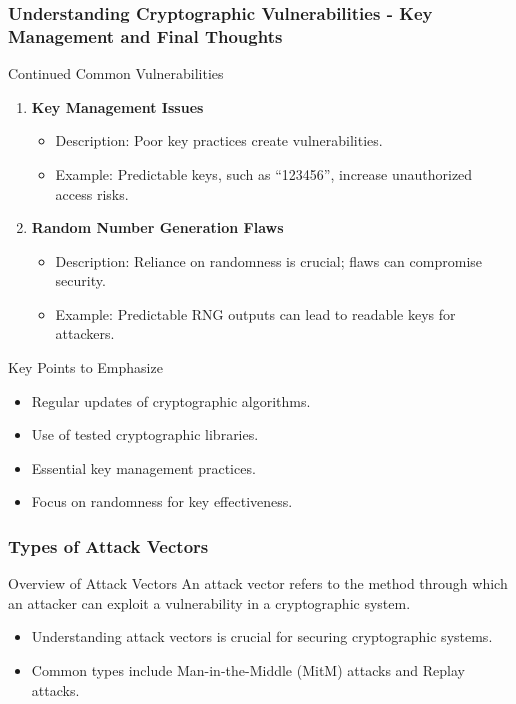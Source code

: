 \documentclass{beamer}
\begin{document}
\begin{frame}[fragile]
    \frametitle{Understanding Cryptographic Vulnerabilities - Key Management and Final Thoughts}
    \begin{block}{Continued Common Vulnerabilities}
        \begin{enumerate}[resume]
            \item \textbf{Key Management Issues}
                \begin{itemize}
                    \item Description: Poor key practices create vulnerabilities.
                    \item Example: Predictable keys, such as ``123456'', increase unauthorized access risks.
                \end{itemize}

            \item \textbf{Random Number Generation Flaws}
                \begin{itemize}
                    \item Description: Reliance on randomness is crucial; flaws can compromise security.
                    \item Example: Predictable RNG outputs can lead to readable keys for attackers.
                \end{itemize}
        \end{enumerate}
    \end{block}

    \begin{block}{Key Points to Emphasize}
        \begin{itemize}
            \item Regular updates of cryptographic algorithms.
            \item Use of tested cryptographic libraries.
            \item Essential key management practices.
            \item Focus on randomness for key effectiveness.
        \end{itemize}
    \end{block}
\end{frame}

\begin{frame}[fragile]
    \frametitle{Types of Attack Vectors}
    
    \begin{block}{Overview of Attack Vectors}
        An attack vector refers to the method through which an attacker can exploit a vulnerability in a cryptographic system.
    \end{block}
    
    \begin{itemize}
        \item Understanding attack vectors is crucial for securing cryptographic systems.
        \item Common types include Man-in-the-Middle (MitM) attacks and Replay attacks.
    \end{itemize}
\end{frame}
\end{document}
